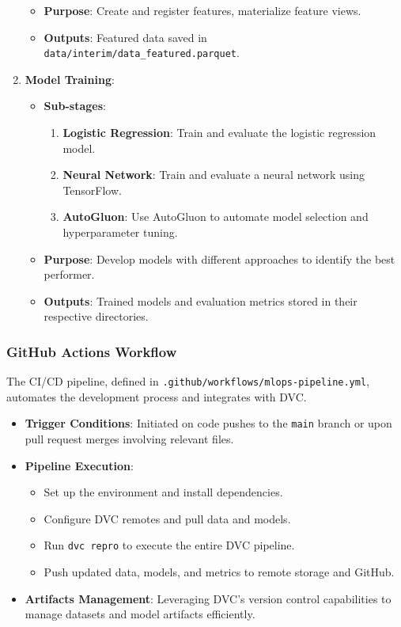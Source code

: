 \documentclass{article}
\begin{document}
\begin{enumerate}[leftmargin=*]
\begin{itemize}[leftmargin=*]
            \item \textbf{Purpose}: Create and register features, materialize feature views.
            \item \textbf{Outputs}: Featured data saved in \texttt{data/interim/data\_featured.parquet}.
        \end{itemize}
    \item \textbf{Model Training}:
        \begin{itemize}[leftmargin=*]
            \item \textbf{Sub-stages}:
                \begin{enumerate}[leftmargin=*]
                    \item \textbf{Logistic Regression}: Train and evaluate the logistic regression model.
                    \item \textbf{Neural Network}: Train and evaluate a neural network using TensorFlow.
                    \item \textbf{AutoGluon}: Use AutoGluon to automate model selection and hyperparameter tuning.
                \end{enumerate}
            \item \textbf{Purpose}: Develop models with different approaches to identify the best performer.
            \item \textbf{Outputs}: Trained models and evaluation metrics stored in their respective directories.
        \end{itemize}
\end{enumerate}

\subsubsection{GitHub Actions Workflow}

The CI/CD pipeline, defined in \texttt{.github/workflows/mlops-pipeline.yml}, automates the development process and integrates with DVC.

\begin{itemize}[leftmargin=*]
    \item \textbf{Trigger Conditions}: Initiated on code pushes to the \texttt{main} branch or upon pull request merges involving relevant files.
    \item \textbf{Pipeline Execution}:
        \begin{itemize}[leftmargin=*]
            \item Set up the environment and install dependencies.
            \item Configure DVC remotes and pull data and models.
            \item Run \texttt{dvc repro} to execute the entire DVC pipeline.
            \item Push updated data, models, and metrics to remote storage and GitHub.
        \end{itemize}
    \item \textbf{Artifacts Management}: Leveraging DVC's version control capabilities to manage datasets and model artifacts efficiently.
\end{itemize}
\end{document}

